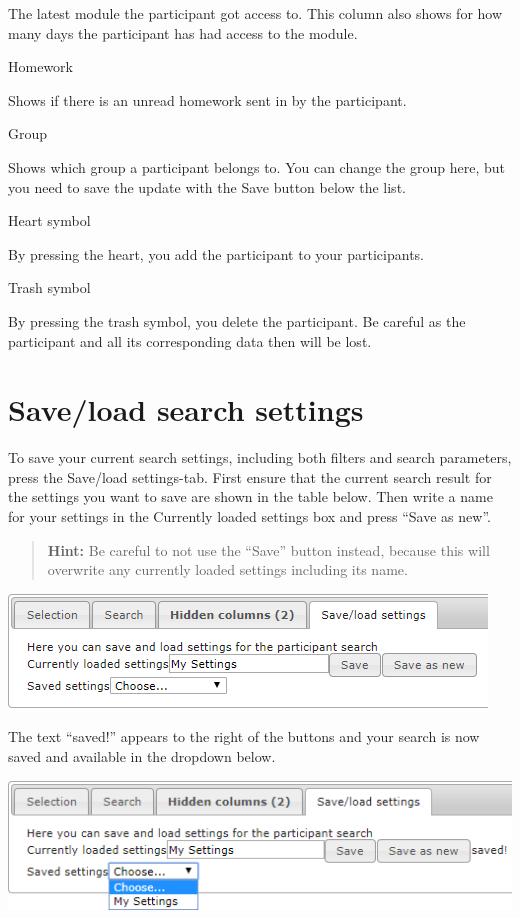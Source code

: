 \documentclass[]{book}
\begin{document}
The latest module the participant got access to. This column also shows for how many days the participant has had access to the module.

Homework

Shows if there is an unread homework sent in by the participant.

Group

Shows which group a participant belongs to. You can change the group here, but you need to save the update with the Save button below the list.

Heart symbol

By pressing the heart, you add the participant to your participants.

Trash symbol

By pressing the trash symbol, you delete the participant. Be careful as the participant and all its corresponding data then will be lost.

\hypertarget{saveload-search-settings}{%
\section{Save/load search settings}\label{saveload-search-settings}}

To save your current search settings, including both filters and search parameters, press the Save/load settings-tab. First ensure that the current search result for the settings you want to save are shown in the table below. Then write a name for your settings in the Currently loaded settings box and press ``Save as new''.

\begin{quote}
\textbf{Hint:} Be careful to not use the ``Save'' button instead, because this will overwrite any currently loaded settings including its name.
\end{quote}

\includegraphics{images/save-load1.png}

The text ``saved!'' appears to the right of the buttons and your search is now saved and available in the dropdown below.

\includegraphics{images/save-load2.png}
\end{document}
